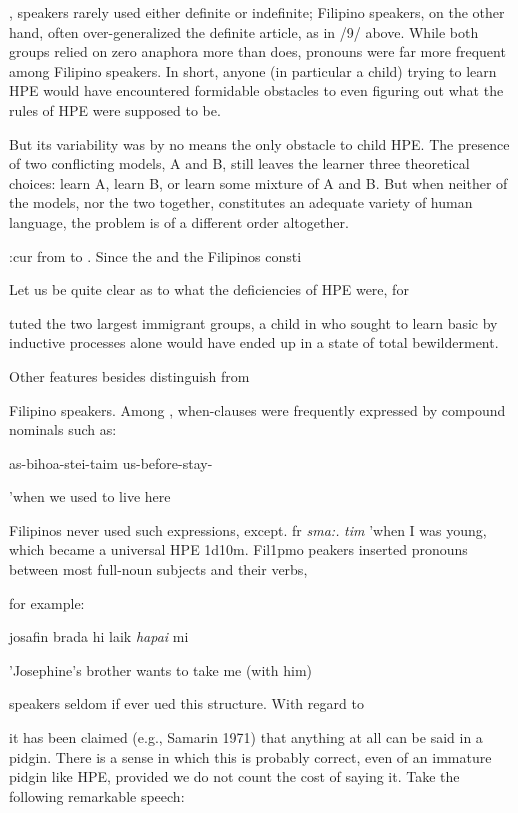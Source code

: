 ,  speakers rarely used either definite or indefinite; Filipino speakers, on the other hand, often over-generalized the definite article, as in /9/ above. While both groups relied on zero anaphora more than  does, pronouns were far more frequent among Filipino speakers. In short, anyone (in particular a child) trying to learn HPE would have encountered formidable obstacles to even figuring out what the rules of HPE were supposed to be.

But its variability was by no means the only obstacle to child  HPE. The presence of two conflicting models, A and B, still leaves the learner three theoretical choices: learn A, learn B, or learn some mixture of A and B. But when neither of the models, nor the two together, constitutes an adequate variety of human language, the problem is of a different order altogether.

:cur from  to . Since the  and the Filipinos consti\-

Let us be quite clear as to what the deficiencies of HPE were, for

tuted the two largest immigrant groups, a child in  who sought to learn basic  by inductive processes alone would have ended up in a state of total bewilderment.

Other features besides  distinguish  from

Filipino speakers. Among , when-clauses were frequently expressed by compound nominals such as:

\ea\label{ex:10}
 as-bihoa-stei-taim us-before-stay-
\glt
\z

'when we used to live here

Filipinos never used such expressions, except. fr \textit{sma:.} \textit{tim} 'when I was young, which became a universal HPE 1d10m. Fil1pmo peakers inserted pronouns between most full-noun subjects and their verbs,

for example:

\ea\label{ex:11}
josafin brada hi laik \textit{hapai} mi
\glt
\z

'Josephine's brother wants to take me (with him)

 speakers seldom if ever ued this structure. With regard to

it has been claimed (e.g., Samarin 1971) that anything at all can be said in a pidgin. There is a sense in which this is probably correct, even of an immature pidgin like HPE, provided we do not count the cost of saying it. Take the following remarkable speech:

